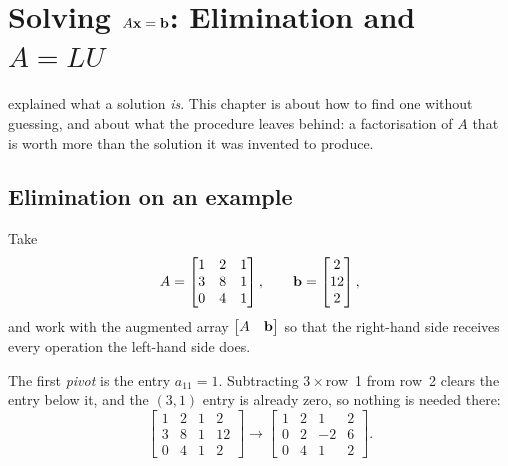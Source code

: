 \setchapterpreamble[u]{\margintoc}
\chapter{Solving \texorpdfstring{\(A\mathbf{x}=\mathbf{b}\)}{Ax=b}: Elimination and
\texorpdfstring{\(A=LU\)}{A=LU}}


 explained what a solution \emph{is}. This
chapter is about how to find one without guessing, and about what the procedure
leaves behind: a factorisation of \(A\) that is worth more than the solution it
was invented to produce.

\section{Elimination on an example}

Take
\[
	A=\begin{bmatrix}1&2&1\\3&8&1\\0&4&1\end{bmatrix},
	\qquad
	\mathbf{b}=\begin{bmatrix}2\\12\\2\end{bmatrix},
\]
and work with the augmented array \(\begin{bmatrix}A&\mathbf{b}\end{bmatrix}\) so
that the right-hand side receives every operation the left-hand side does.

The first \emph{pivot} is the entry \(a_{11}=1\). Subtracting \(3\times\)row~1
from row~2 clears the entry below it, and the \((3,1)\) entry is already zero, so
nothing is needed there:
\[
	\left[\begin{array}{ccc|c}
		1&2&1&2\\ 3&8&1&12\\ 0&4&1&2
	\end{array}\right]
	\longrightarrow
	\left[\begin{array}{ccc|c}
		1&2&1&2\\ 0&2&-2&6\\ 0&4&1&2
	\end{array}\right].
\]


